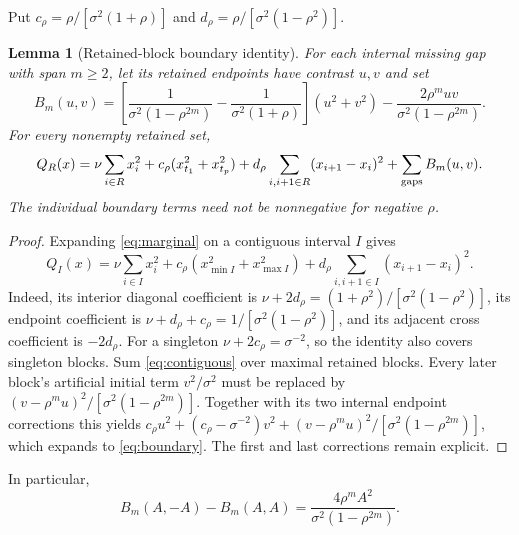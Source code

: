 \documentclass[11pt]{article}
\newtheorem{lemma}{Lemma}
\newcommand{\sig}{\sigma}
\begin{document}
Put $c_\rho=\rho/[\sig^2(1+\rho)]$ and
$d_\rho=\rho/[\sig^2(1-\rho^2)]$.
\begin{lemma}[Retained-block boundary identity]\label{lem:block}
For each internal missing gap with span $m\ge2$, let its retained endpoints
have contrast $u,v$ and set
\begin{equation}\label{eq:boundary}
 B_m(u,v)=\left[\frac1{\sig^2(1-\rho^{2m})}
 -\frac1{\sig^2(1+\rho)}\right](u^2+v^2)
 -\frac{2\rho^muv}{\sig^2(1-\rho^{2m})}.
\end{equation}
For every nonempty retained set,
\begin{equation}\label{eq:block}
 Q_R(x)=\nu\sum_{i\in R}x_i^2+c_\rho(x_{t_1}^2+x_{t_p}^2)
 +d_\rho\sum_{i,i+1\in R}(x_{i+1}-x_i)^2+\sum_{\rm gaps}B_m(u,v).
\end{equation}
The individual boundary terms need not be nonnegative for negative $\rho$.
\end{lemma}
\begin{proof}
Expanding \eqref{eq:marginal} on a contiguous interval $I$ gives
\begin{equation}\label{eq:contiguous}
 Q_I(x)=\nu\sum_{i\in I}x_i^2+c_\rho(x_{\min I}^2+x_{\max I}^2)
 +d_\rho\sum_{i,i+1\in I}(x_{i+1}-x_i)^2.
\end{equation}
Indeed, its interior diagonal coefficient is
$\nu+2d_\rho=(1+\rho^2)/[\sig^2(1-\rho^2)]$, its endpoint coefficient is
$\nu+d_\rho+c_\rho=1/[\sig^2(1-\rho^2)]$, and its adjacent cross coefficient
is $-2d_\rho$. For a singleton $\nu+2c_\rho=\sig^{-2}$, so the identity
also covers singleton blocks. Sum \eqref{eq:contiguous} over maximal retained
blocks. Every later block's artificial initial term $v^2/\sig^2$ must be
replaced by $(v-\rho^m u)^2/[\sig^2(1-\rho^{2m})]$. Together with its two
internal endpoint corrections this yields
$c_\rho u^2+(c_\rho-\sig^{-2})v^2+
(v-\rho^m u)^2/[\sig^2(1-\rho^{2m})]$, which expands to
\eqref{eq:boundary}. The first and last corrections remain explicit.
\end{proof}
In particular,
\begin{equation}\label{eq:sign}
 B_m(A,-A)-B_m(A,A)=\frac{4\rho^m A^2}{\sig^2(1-\rho^{2m})}.
\end{equation}
\end{document}
